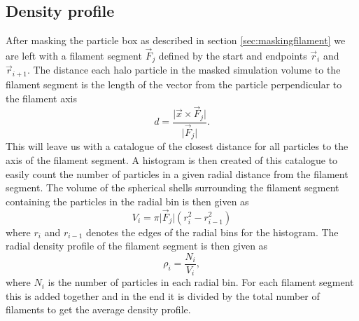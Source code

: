 \subsection{Density profile}\label{sec:filamentdensity}
After masking the particle box as described in section \ref{sec:maskingfilament}
we are left with a filament segment $\vec{F}_j$ defined by the start and
endpoints $\vec{r}_{i}$ and $\vec{r}_{i+1}$. The distance each halo particle in
the masked simulation volume to the filament segment is the length of the vector
from the particle perpendicular to the filament axis
\begin{equation}\label{eq:distance_from_filament}
    d=\frac{\vert \vec{x}\times\vec{F}_j\vert}{\vert \vec{F}_j\vert}.
\end{equation}
This will leave us with a catalogue of the closest distance for all particles to
the axis of the filament segment. A histogram is then created of this catalogue
to easily count the number of particles in a given radial distance from the
filament segment. The volume of the spherical shells surrounding the filament segment
containing the particles in the radial bin is then given as
\begin{equation}
    V_i={\pi\vert \vec{F}_j\vert(r_i^2-r_{i-1}^2)}
\end{equation}
where $r_i$ and $r_{i-1}$ denotes the edges of the radial bins for the histogram.
The radial density profile of the filament segment is then given as
\begin{equation}
    \rho_i=\frac{N_i}{V_i},
\end{equation}
where $N_i$ is the number of particles in each radial bin. For each filament segment
this is added together and in the end it is divided by the total number of
filaments to get the average density profile.
